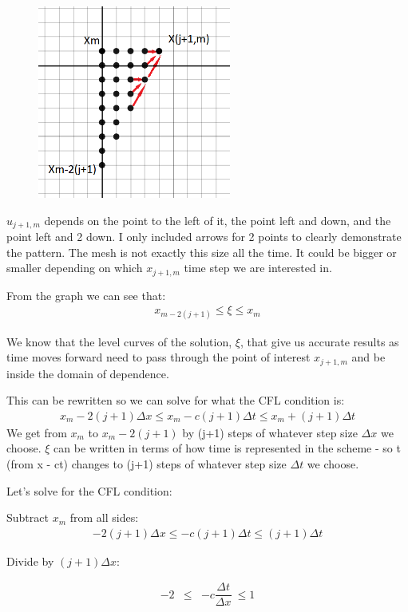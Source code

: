 \documentclass{article}
\newcommand{\bea}{\begin{eqnarray*}}
\newcommand{\eea}{\end{eqnarray*}}
\begin{document}
\begin{figure}[ht]
\begin{center}
  \includegraphics[width=2.5in]{CFLcondition.png}
  \end{center}
\end{figure}
\newpage
$u_{j+1,m}$ depends on the point to the left of it, the point left and down, and the point left and 2 down. I only included arrows for 2 points to clearly demonstrate the pattern. The mesh is not exactly this size all the time. It could be bigger or smaller depending on which $x_{j+1,m}$ time step we are interested in. \newline

From the graph we can see that:
\bea
 x_{m-2(j+1)} \leq \xi \leq  x_{m}
\eea

We know that the level curves of the solution, $\xi$, that give us accurate results as time moves forward need to pass through the point of interest $x_{j+1,m}$ and be inside the domain of dependence.\newline

This can be rewritten so we can solve for what the CFL condition is:  
\bea
 x_{m}-2(j+1)\Delta x \leq  x_{m}-c(j+1)\Delta t \leq  x_{m}+(j+1)\Delta t
\eea
We get from $x_{m}$ to $x_{m}-2(j+1)$ by (j+1) steps of whatever step size $\Delta x$ we choose. $\xi$ can be written in terms of how time is represented in the scheme - so t (from x - ct) changes to (j+1) steps of whatever step size $\Delta t$ we choose. \newline

Let's solve for the CFL condition:

Subtract $x_m$ from all sides:
\bea
-2(j+1)\Delta x \leq -c(j+1)\Delta t \leq (j+1)\Delta t
\eea

Divide by $(j + 1)\Delta x$:

\bea
-2 &\leq& -c\dfrac{\Delta t}{\Delta x}\ \leq 1 \\
\eea
\end{document}
